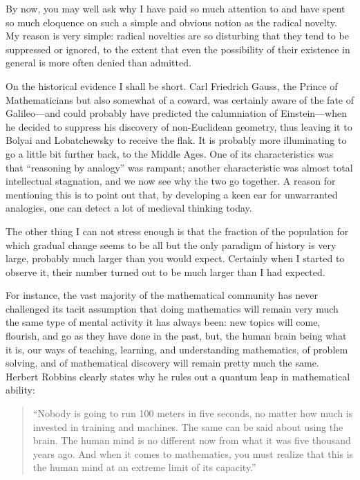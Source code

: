 \documentclass[a4paper,12pt]{article}
\begin{document}
By now, you may well ask why I have paid so much attention to and have
spent so much eloquence on such a simple and obvious notion as the
radical novelty.  My reason is very simple: radical novelties are so
disturbing that they tend to be suppressed or ignored, to the extent
that even the possibility of their existence in general is more often
denied than admitted.

On the historical evidence I shall be short.  Carl Friedrich Gauss, the
Prince of Mathematicians but also somewhat of a coward, was certainly
aware of the fate of Galileo---and could probably have predicted the
calumniation of Einstein---when he decided to suppress his discovery of
non-Euclidean geometry, thus leaving it to Bolyai and Lobatchewsky to
receive the flak.  It is probably more illuminating to go a little bit
further back, to the Middle Ages.  One of its characteristics was that
``reasoning by analogy'' was rampant; another characteristic was almost
total intellectual stagnation, and we now see why the two go together.
A reason for mentioning this is to point out that, by developing a keen
ear for unwarranted analogies, one can detect a lot of medieval thinking
today.

The other thing I can not stress enough is that the fraction of the
population for which gradual change seems to be all but the only
paradigm of history is very large, probably much larger than you would
expect.  Certainly when I started to observe it, their number turned out
to be much larger than I had expected.

For instance, the vast majority of the mathematical community has never
challenged its tacit assumption that doing mathematics will remain very
much the same type of mental activity it has always been: new topics
will come, flourish, and go as they have done in the past, but, the
human brain being what it is, our ways of teaching, learning, and
understanding mathematics, of problem solving, and of mathematical
discovery will remain pretty much the same.  Herbert Robbins clearly
states why he rules out a quantum leap in mathematical ability:

\begin{quote}
``Nobody is going to run 100 meters in five seconds, no matter how much
is invested in training and machines.  The same can be said about using
the brain.  The human mind is no different now from what it was five
thousand years ago.  And when it comes to mathematics, you must realize
that this is the human mind at an extreme limit of its capacity.''
\end{quote}
\end{document}
